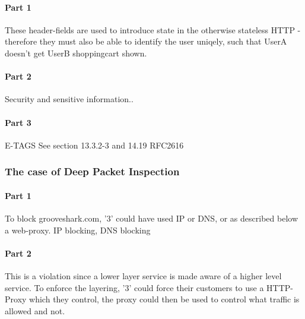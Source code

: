 \paragraph{Part 1} These header-fields are used to introduce state in the
otherwise stateless HTTP - therefore they must also be able to identify the
user uniqely, such that UserA doesn't get UserB shoppingcart shown.

\paragraph{Part 2} Security and sensitive information..

\paragraph{Part 3} E-TAGS See section 13.3.2-3 and 14.19 RFC2616

\subsubsection{The case of Deep Packet Inspection}
\paragraph{Part 1} To block grooveshark.com, '3' could have used IP or DNS, or
as described below a web-proxy. IP blocking, DNS blocking 

\paragraph{Part 2} This is a violation since a lower layer service is made
aware of a higher level service. To enforce the layering, '3' could force their
customers to use a HTTP-Proxy which they control, the proxy could then be used 
to control what traffic is allowed and not.
